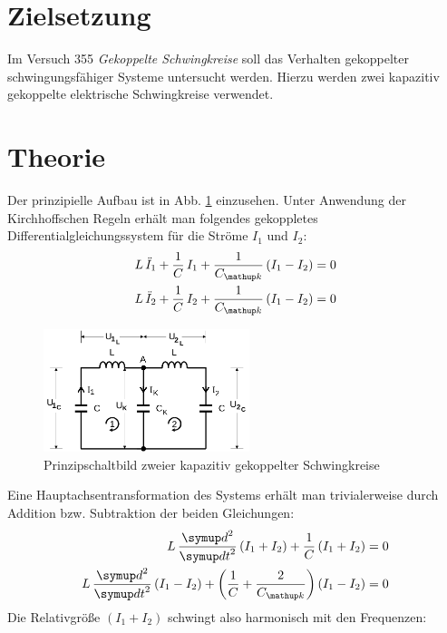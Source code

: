 \setcounter{page}{1}
\section*{Zielsetzung}
Im Versuch 355 \emph{Gekoppelte Schwingkreise} soll das Verhalten gekoppelter schwingungsfähiger Systeme untersucht werden. Hierzu
werden zwei kapazitiv gekoppelte elektrische Schwingkreise verwendet.
\section{Theorie}
Der prinzipielle Aufbau ist in Abb. \ref{fig: prinz_schwingkreis} einzusehen. Unter Anwendung der Kirchhoffschen Regeln erhält man folgendes gekoppletes
Differentialgleichungssystem für die Ströme $I_1$ und $I_2$:
\begin{align}
\begin{aligned}
L \, \ddot{I}_1 + \frac{1}{C} \, I_1 + \frac{1}{C\ua{k}} \left(I_1 - I_2 \right) &= 0 \\
L \, \ddot{I}_2 + \frac{1}{C} \, I_2 + \frac{1}{C\ua{k}} \left(I_1 - I_2 \right) &= 0 \\
\end{aligned}
\end{align}

\begin{figure}
  \centering
  \includegraphics[width = 6cm]{pics/prinzip_schwingkreis.png}
  \caption{Prinzipschaltbild zweier kapazitiv gekoppelter Schwingkreise \cite{anleitung355}}
  \label{fig: prinz_schwingkreis}
\end{figure}

Eine Hauptachsentransformation des Systems erhält man trivialerweise durch Addition bzw.
Subtraktion der beiden Gleichungen:
\begin{align}
\begin{aligned}
  L\,\frac{\dif{}^2}{\dif{t}^2} \left( I_1 + I_2 \right) + \frac{1}{C} \left( I_1 + I_2 \right) &= 0 \\
  L\,\frac{\dif{}^2}{\dif{t}^2} \left( I_1 - I_2 \right) + \left(\frac{1}{C} + \frac{2}{C\ua{k}}\right) \left( I_1 - I_2 \right) &= 0 \\
  \label{eq: gekoppeltes_lgs}
\end{aligned}
\end{align}
Die Relativgröße $\left( I_1 + I_2 \right)$ schwingt also harmonisch mit den Frequenzen:

